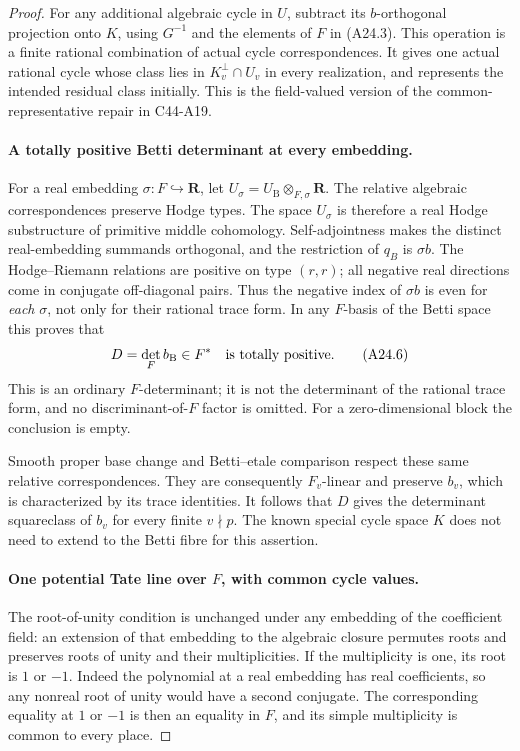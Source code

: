 \documentclass[11pt]{article}
\theoremstyle{remark}\newtheorem{remark}[theorem]{Remark}
\begin{document}
\begin{proof}
For any additional algebraic cycle in $U$, subtract its $b$-orthogonal
projection onto $K$, using $G^{-1}$ and the elements of $F$ in (A24.3).
This operation is a finite rational combination of actual cycle
correspondences.  It gives one actual rational cycle whose class lies
in $K_v^\perp\cap U_v$ in every realization, and represents the intended
residual class initially.  This is the field-valued version of the
common-representative repair in C44-A19.

\paragraph{A totally positive Betti determinant at every embedding.}
For a real embedding $\sigma:F\hookrightarrow\mathbf R$, let
$U_\sigma=U_{\mathrm B}\otimes_{F,\sigma}\mathbf R$.
The relative algebraic correspondences preserve Hodge types.  The
space $U_\sigma$ is therefore a real Hodge substructure of primitive
middle cohomology.  Self-adjointness makes the distinct real-embedding
summands orthogonal, and the restriction of $q_B$ is $\sigma b$.
The Hodge--Riemann relations are positive on type $(r,r)$; all negative
real directions come in conjugate off-diagonal pairs.  Thus the
negative index of $\sigma b$ is even for \emph{each} $\sigma$, not
only for their rational trace form.
In any $F$-basis of the Betti space this proves that
\[
                            D=\det_F b_{\mathrm B}\in F^*
              \quad\hbox{is totally positive}.
 \tag{A24.6}
\]
This is an ordinary $F$-determinant; it is not the determinant of the
rational trace form, and no discriminant-of-$F$ factor is omitted.
For a zero-dimensional block the conclusion is empty.

Smooth proper base change and Betti--etale comparison respect these
same relative correspondences.  They are consequently $F_v$-linear
and preserve $b_v$, which is characterized by its trace identities.
It follows that $D$ gives the determinant squareclass of $b_v$ for
every finite $v\nmid p$.  The known special cycle space $K$ does not
need to extend to the Betti fibre for this assertion.

\paragraph{One potential Tate line over $F$, with common cycle values.}
The root-of-unity condition is unchanged under any embedding of the
coefficient field: an extension of that embedding to the algebraic
closure permutes roots and preserves roots of unity and their
multiplicities.  If the multiplicity is one, its root is $1$ or $-1$.
Indeed the polynomial at a real embedding has real coefficients,
so any nonreal root of unity would have a second conjugate.  The
corresponding equality at $1$ or $-1$ is then an equality in $F$,
and its simple multiplicity is common to every place.


\end{proof}
\end{document}
